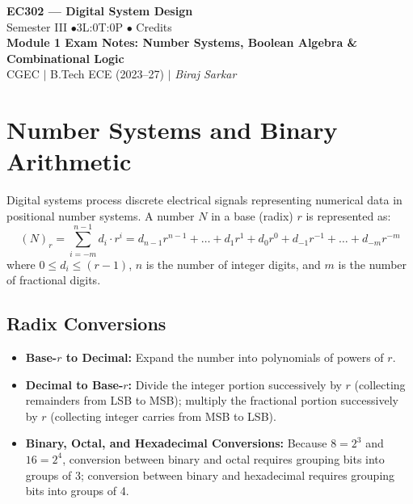 \documentclass[12pt,a4paper]{article}
\begin{document}
\begin{center}
  {\LARGE\bfseries\color{myred} EC302 --- Digital System Design}\\[5pt]
  {\normalsize\color{mydark} Semester III \quad$\bullet$\quad 3L:0T:0P \quad$\bullet$ Credits}\\[3pt]
  {\normalsize\color{myteal}\textbf{Module 1 Exam Notes: Number Systems, Boolean Algebra \& Combinational Logic}}\\[3pt]
  {\small\color{mydark} CGEC \;$|$\; B.Tech ECE (2023--27) \;$|$\; \textit{Biraj Sarkar}}
\end{center}
\vspace{2pt}
\noindent{\color{myred}\rule{\linewidth}{1.5pt}}
\vspace{2pt}

\hypersetup{linkcolor=mydark}
\tableofcontents
\hypersetup{linkcolor=myteal}
\newpage

\section{Number Systems and Binary Arithmetic}

Digital systems process discrete electrical signals representing numerical data in positional number systems. A number $N$ in a base (radix) $r$ is represented as:
\begin{equation}
  (N)_r = \sum_{i=-m}^{n-1} d_i \cdot r^i = d_{n-1} r^{n-1} + \dots + d_1 r^1 + d_0 r^0 + d_{-1} r^{-1} + \dots + d_{-m} r^{-m}
\end{equation}
where $0 \le d_i \le (r-1)$, $n$ is the number of integer digits, and $m$ is the number of fractional digits.

\subsection{Radix Conversions}
\begin{itemize}[leftmargin=*, itemsep=3pt]
  \item \textbf{Base-$r$ to Decimal:} Expand the number into polynomials of powers of $r$.
  \item \textbf{Decimal to Base-$r$:} Divide the integer portion successively by $r$ (collecting remainders from LSB to MSB); multiply the fractional portion successively by $r$ (collecting integer carries from MSB to LSB).
  \item \textbf{Binary, Octal, and Hexadecimal Conversions:} Because $8 = 2^3$ and $16 = 2^4$, conversion between binary and octal requires grouping bits into groups of 3; conversion between binary and hexadecimal requires grouping bits into groups of 4.
\end{itemize}
\end{document}
